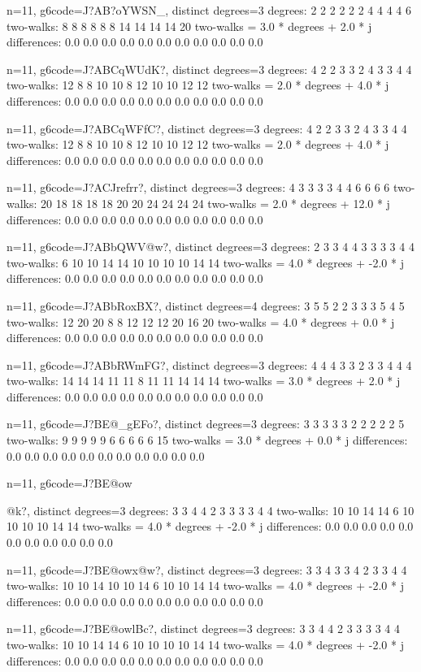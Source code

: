 {{{{{{{{n=11, g6code=J?AB?oYWSN_, distinct degrees=3
degrees: 2 2 2 2 2 2 4 4 4 4 6 
two-walks: 8 8 8 8 8 8 14 14 14 14 20 
two-walks = 3.0 * degrees + 2.0 * j
differences: 0.0 0.0 0.0 0.0 0.0 0.0 0.0 0.0 0.0 0.0 0.0 

n=11, g6code=J?ABCqWUdK?, distinct degrees=3
degrees: 4 2 2 3 3 2 4 3 3 4 4 
two-walks: 12 8 8 10 10 8 12 10 10 12 12 
two-walks = 2.0 * degrees + 4.0 * j
differences: 0.0 0.0 0.0 0.0 0.0 0.0 0.0 0.0 0.0 0.0 0.0 

n=11, g6code=J?ABCqWFfC?, distinct degrees=3
degrees: 4 2 2 3 3 2 4 3 3 4 4 
two-walks: 12 8 8 10 10 8 12 10 10 12 12 
two-walks = 2.0 * degrees + 4.0 * j
differences: 0.0 0.0 0.0 0.0 0.0 0.0 0.0 0.0 0.0 0.0 0.0 

n=11, g6code=J?ACJrefrr?, distinct degrees=3
degrees: 4 3 3 3 3 4 4 6 6 6 6 
two-walks: 20 18 18 18 18 20 20 24 24 24 24 
two-walks = 2.0 * degrees + 12.0 * j
differences: 0.0 0.0 0.0 0.0 0.0 0.0 0.0 0.0 0.0 0.0 0.0 

n=11, g6code=J?ABbQWV@w?, distinct degrees=3
degrees: 2 3 3 4 4 3 3 3 3 4 4 
two-walks: 6 10 10 14 14 10 10 10 10 14 14 
two-walks = 4.0 * degrees + -2.0 * j
differences: 0.0 0.0 0.0 0.0 0.0 0.0 0.0 0.0 0.0 0.0 0.0 

n=11, g6code=J?ABbRoxBX?, distinct degrees=4
degrees: 3 5 5 2 2 3 3 3 5 4 5 
two-walks: 12 20 20 8 8 12 12 12 20 16 20 
two-walks = 4.0 * degrees + 0.0 * j
differences: 0.0 0.0 0.0 0.0 0.0 0.0 0.0 0.0 0.0 0.0 0.0 

n=11, g6code=J?ABbRWmFG?, distinct degrees=3
degrees: 4 4 4 3 3 2 3 3 4 4 4 
two-walks: 14 14 14 11 11 8 11 11 14 14 14 
two-walks = 3.0 * degrees + 2.0 * j
differences: 0.0 0.0 0.0 0.0 0.0 0.0 0.0 0.0 0.0 0.0 0.0 

n=11, g6code=J?BE@_gEFo?, distinct degrees=3
degrees: 3 3 3 3 3 2 2 2 2 2 5 
two-walks: 9 9 9 9 9 6 6 6 6 6 15 
two-walks = 3.0 * degrees + 0.0 * j
differences: 0.0 0.0 0.0 0.0 0.0 0.0 0.0 0.0 0.0 0.0 0.0 

n=11, g6code=J?BE@ow{@k?, distinct degrees=3
degrees: 3 3 4 4 2 3 3 3 3 4 4 
two-walks: 10 10 14 14 6 10 10 10 10 14 14 
two-walks = 4.0 * degrees + -2.0 * j
differences: 0.0 0.0 0.0 0.0 0.0 0.0 0.0 0.0 0.0 0.0 0.0 

n=11, g6code=J?BE@owx@w?, distinct degrees=3
degrees: 3 3 4 3 3 4 2 3 3 4 4 
two-walks: 10 10 14 10 10 14 6 10 10 14 14 
two-walks = 4.0 * degrees + -2.0 * j
differences: 0.0 0.0 0.0 0.0 0.0 0.0 0.0 0.0 0.0 0.0 0.0 

n=11, g6code=J?BE@owlBc?, distinct degrees=3
degrees: 3 3 4 4 2 3 3 3 3 4 4 
two-walks: 10 10 14 14 6 10 10 10 10 14 14 
two-walks = 4.0 * degrees + -2.0 * j
differences: 0.0 0.0 0.0 0.0 0.0 0.0 0.0 0.0 0.0 0.0 0.0 

}}}}}}}}}
